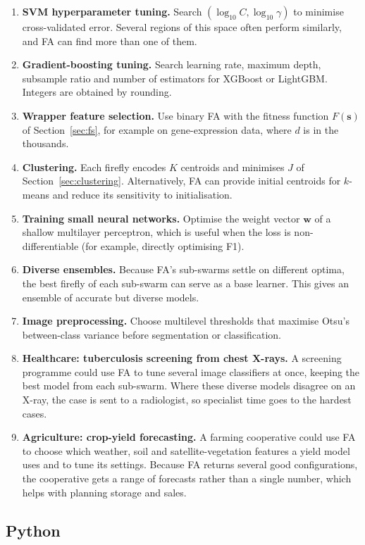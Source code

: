 \documentclass[11pt,a4paper]{article}
\newcommand{\vect}[1]{\mathbf{#1}}
\begin{document}
\begin{enumerate}
  \item \textbf{SVM hyperparameter tuning.} Search $(\log_{10} C, \log_{10}\gamma)$ to minimise cross-validated error. Several regions of this space often perform similarly, and FA can find more than one of them.
  \item \textbf{Gradient-boosting tuning.} Search learning rate, maximum depth, subsample ratio and number of estimators for XGBoost or LightGBM. Integers are obtained by rounding.
  \item \textbf{Wrapper feature selection.} Use binary FA with the fitness function $F(\vect{s})$ of Section~\ref{sec:fs}, for example on gene-expression data, where $d$ is in the thousands.
  \item \textbf{Clustering.} Each firefly encodes $K$ centroids and minimises $J$ of Section~\ref{sec:clustering}. Alternatively, FA can provide initial centroids for $k$-means and reduce its sensitivity to initialisation.
  \item \textbf{Training small neural networks.} Optimise the weight vector $\vect{w}$ of a shallow multilayer perceptron, which is useful when the loss is non-differentiable (for example, directly optimising F1).
  \item \textbf{Diverse ensembles.} Because FA's sub-swarms settle on different optima, the best firefly of each sub-swarm can serve as a base learner. This gives an ensemble of accurate but diverse models.
  \item \textbf{Image preprocessing.} Choose multilevel thresholds that maximise Otsu's between-class variance \citep{otsu1979} before segmentation or classification.
  \item \textbf{Healthcare: tuberculosis screening from chest X-rays.} A screening programme could use FA to tune several image classifiers at once, keeping the best model from each sub-swarm. Where these diverse models disagree on an X-ray, the case is sent to a radiologist, so specialist time goes to the hardest cases.
  \item \textbf{Agriculture: crop-yield forecasting.} A farming cooperative could use FA to choose which weather, soil and satellite-vegetation features a yield model uses and to tune its settings. Because FA returns several good configurations, the cooperative gets a range of forecasts rather than a single number, which helps with planning storage and sales.
\end{enumerate}

\subsection{Python}
\end{document}
